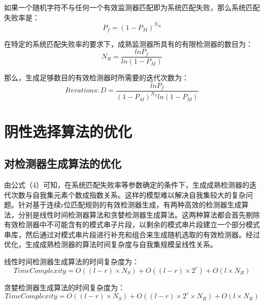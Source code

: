 \documentclass[preprint,12pt,3p]{elsarticle}
\begin{document}
\par
如果一个随机字符不与任何一个有效监测器匹配即为系统匹配失败，那么系统匹配失败率是：
\begin{equation}
    P_f=(1-P_{M})^{N_{R}}
\end{equation}

\par
在特定的系统匹配失败率的要求下，成熟监测器所具有的有限检测器的数目为：
\begin{equation}
    N_R=\frac{lnP_f}{ln(1-P_M)}
\end{equation}

\par
那么，生成足够数目的有效检测器时所需要的迭代次数为：
\begin{equation}
    Iterations:D=\frac{lnP_f}{(1-P_{M})^{N_{S}}ln(1-P_M)}
\end{equation}

\section{阴性选择算法的优化}
\label{sec1}
\subsection{对检测器生成算法的优化}
\label{subsec1}
由公式（4）可知，在系统匹配失败率等参数确定的条件下，生成成熟检测器的迭代次数与自我集元素个数成指数关系。这样的模型难以解决自我集较大的复杂问题。针对基于连续r位匹配规则的有效检测器生成，有两种高效的检测器生成算法，分别是线性时间检测器算法和贪婪检测器生成算法。这两种算法都会首先剔除有效检测器中不可能含有的模式串子片段，以剩余的模式串片段建立一个部分模式串库，然后通过对模式串片段进行补充和组合来生成随机选取的有效检测器。经过优化，生成成熟检测器的算法时间复杂度与自我集规模呈线性关系。
\par
线性时间检测器生成算法的时间复杂度为：
\begin{equation}
    TimeComplexity=O((l-r)\times{N_S})+O((l-r)\times{2^r})+O(l\times{N_R})
\end{equation}
\par
贪婪检测器生成算法的时间复杂度为：
\begin{equation}
    TimeComplexity=O((l-r)\times{N_S})+O((l-r)\times{2^r}\times{N_R})+O(l\times{N_R})
\end{equation}
\end{document}
